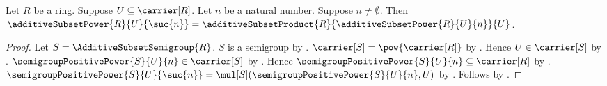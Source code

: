 \begin{proposition}\label{additive_subset_power_successor}
    Let $R$ be a ring.
    Suppose $U\subseteq\carrier[R]$.
    Let $n$ be a natural number.
    Suppose $n\neq\emptyset$.
    Then $\additiveSubsetPower{R}{U}{\suc{n}}
        =\additiveSubsetProduct{R}{\additiveSubsetPower{R}{U}{n}}{U}$.
\end{proposition}
\begin{proof}
    Let $S=\AdditiveSubsetSemigroup{R}$.
    $S$ is a semigroup by .
    $\carrier[S]=\pow{\carrier[R]}$ by
        .
    Hence $U\in\carrier[S]$ by .
    $\semigroupPositivePower{S}{U}{n}\in\carrier[S]$ by
        .
    Hence $\semigroupPositivePower{S}{U}{n}\subseteq\carrier[R]$ by
        .
    $\semigroupPositivePower{S}{U}{\suc{n}}
        =\mul[S](\semigroupPositivePower{S}{U}{n},U)$ by
        .
    Follows by
        .
\end{proof}

